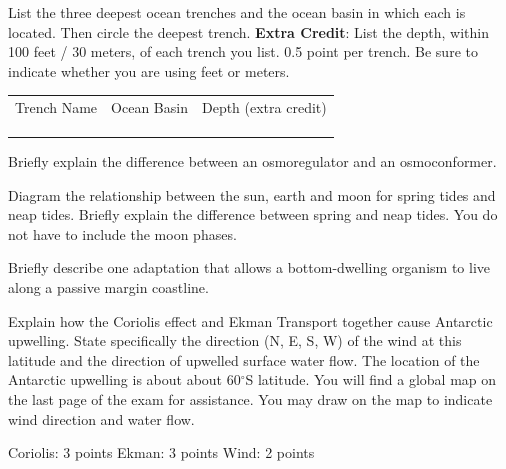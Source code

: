 \documentclass[11pt]{exam}
\begin{document}
\begin{questions}
\question[5]
List the three deepest ocean trenches and the ocean basin in which each is located.  Then circle the deepest trench. \textbf{Extra Credit}:  List the depth, within 100 feet / 30 meters, of each trench you list. 0.5 point per trench. Be sure to indicate whether you are using feet or meters.

\vspace{\baselineskip}

	\begin{tabular}{ccc}
		\large Trench Name		&	\large Ocean Basin	&	\large Depth \small(extra credit) \\[5ex]
		\makebox[5cm]{\hrulefill} & \makebox[5cm]{\hrulefill} & \makebox[4cm]{\hrulefill} \\[5ex]
		\makebox[5cm]{\hrulefill} & \makebox[5cm]{\hrulefill} & \makebox[4cm]{\hrulefill}\\[5ex]
		\makebox[5cm]{\hrulefill} & \makebox[5cm]{\hrulefill} & \makebox[4cm]{\hrulefill} \\
	\end{tabular}

\question[5]
Briefly explain the difference between an osmoregulator and an osmoconformer.

\question[10]
Diagram the relationship between the sun, earth and moon for spring tides and neap tides. Briefly explain the difference between spring and neap tides. You do not have to include the moon phases.

\newpage

\question[5]
Briefly describe one adaptation that allows a bottom-dwelling organism to live along a passive margin coastline.


\question[10]
Explain how the Coriolis effect and Ekman Transport together cause Antarctic upwelling. State specifically the direction (N, E, S, W) of the wind at this latitude and the direction of upwelled surface water flow.  The location of the Antarctic upwelling is about about 60$^\circ$S latitude.  You will find a global map on the last page of the exam for assistance.  You may draw on the map to indicate wind direction and water flow.


\begin{solution}
Coriolis: 3 points
Ekman: 3 points
Wind: 2 points
\end{solution}


\end{questions}
\end{document}
